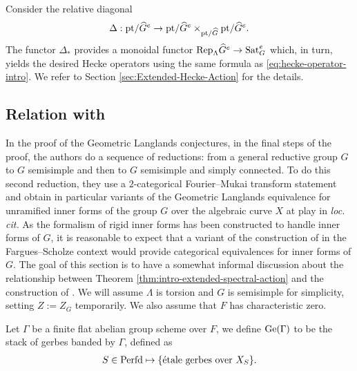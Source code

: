 Consider the relative diagonal 
$$\Delta : \mathrm{pt}/\widehat{G}^e \to \mathrm{pt}/\widehat{G}^e \times_{\mathrm{pt}/\widehat{G}} \mathrm{pt}/\widehat{G}^e.$$
The functor $\Delta_*$ provides a monoidal functor $\mathrm{Rep}_{\Lambda}\widehat{G}^e \to \mathrm{Sat}_G^e$ which, in turn, yields the desired Hecke operators using the same formula as \eqref{eq:hecke-operator-intro}. We refer to Section \ref{sec:Extended-Hecke-Action} for the details. 

\subsection{Relation with \cite{GLCV}}
In the proof of the Geometric Langlands conjectures, in the final steps of the proof, the authors do a sequence of reductions: from a general reductive group $G$ to $G$ semisimple and then to $G$ semisimple and simply connected. To do this second reduction, they use a $2$-categorical Fourier--Mukai transform statement and obtain in particular variants of the Geometric Langlands equivalence for unramified inner forms \cite[Corollary 8.10.2]{GLCV} of the group $G$ over the algebraic curve $X$ at play in \emph{loc. cit.} As the formalism of rigid inner forms has been constructed to handle inner forms of $G$, it is reasonable to expect that a variant of the construction of \cite{GLCV} in the Fargues--Scholze context would provide categorical equivalences for inner forms of $G$. The goal of this section is to have a somewhat informal discussion about the relationship between Theorem \ref{thm:intro-extended-spectral-action} and the construction of \cite{GLCV}. We will assume $\Lambda$ is torsion and $G$ is semisimple for simplicity, setting $Z:= Z_{G}$ temporarily. We also assume that $F$ has characteristic zero.

\begin{defi}
    Let $\Gamma$ be a finite flat abelian group scheme over $F$, we define $\mathrm{Ge}(\Gamma)$ to be the stack of gerbes banded by $\Gamma$, defined as 
    \begin{align*}
        S \in \mathrm{Perfd} \mapsto \{\textnormal{\'{e}tale gerbes over} \ X_S\}.
    \end{align*}
\end{defi}

